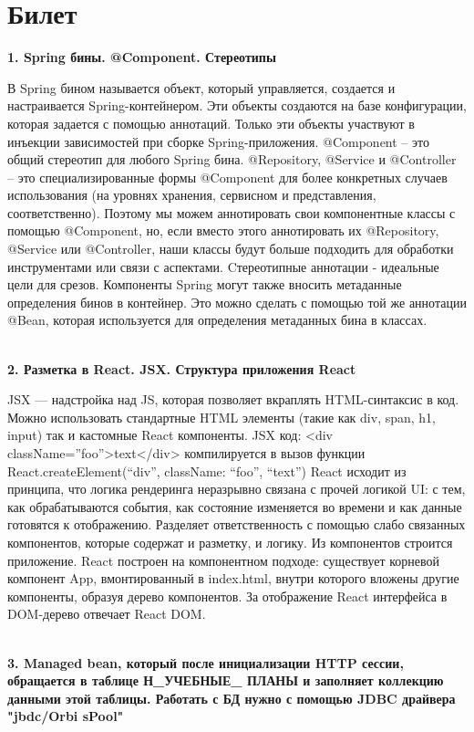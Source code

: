 \documentclass{article}
\newcommand{\bil}[5]{%
        \section{Билет}
        \textbf{1. #1}

        #4
        \\
        \textbf{2. #2}
        
        #5
        \\
        \textbf{3. #3}
}
\begin{document}
\bil{Spring бины. @Component. Стереотипы}
{Разметка в React. JSX. Структура приложения React}
{Managed bean, который после инициализации HTTP сессии, обращается в таблице Н\_УЧЕБНЫЕ\_ ПЛАНЫ и заполняет коллекцию данными этой таблицы. Работать с БД нужно с помощью JDBC драйвера "jbdc/Orbi sPool"}{
    В Spring бином называется объект, который управляется, создается и настраивается Spring-контейнером. 
    Эти объекты создаются на базе конфигурации, которая задается с помощью аннотаций. 
    Только эти объекты участвуют в инъекции зависимостей при сборке Spring-приложения.
    @Component – это общий стереотип для любого Spring бина. @Repository, @Service и @Controller – это специализированные формы @Component для более конкретных случаев использования (на уровнях хранения, сервисном и представления, соответственно). 
    Поэтому мы можем аннотировать свои компонентные классы с помощью @Component, но, если вместо этого аннотировать их @Repository, @Service или @Controller, наши классы будут больше подходить для обработки инструментами или связи с аспектами. 
    Cтереотипные аннотации - идеальные цели для срезов.
    Компоненты Spring могут также вносить метаданные определения бинов в контейнер. 
    Это можно сделать с помощью той же аннотации @Bean, которая используется для определения метаданных бина в классах.
}{
    JSX — надстройка над JS, которая позволяет вкраплять HTML-синтаксис в код. 
    Можно использовать стандартные HTML элементы (такие как div, span, h1, input) так и кастомные React компоненты. 
    JSX код: <div className=”foo”>text</div> компилируется в вызов функции React.createElement(“div”, className: “foo”, “text”)
    React исходит из принципа, что логика рендеринга неразрывно связана с прочей логикой UI: с тем, как обрабатываются события, как состояние изменяется во времени и как данные готовятся к отображению.
    Разделяет ответственность с помощью слабо связанных компонентов, которые содержат и разметку, и логику. Из компонентов строится приложение. 
    React построен на компонентном подходе: существует корневой компонент App, вмонтированный в index.html, внутри которого вложены другие компоненты, образуя дерево компонентов. 
    За отображение React интерфейса в DOM-дерево отвечает React DOM.
}
\end{document}
